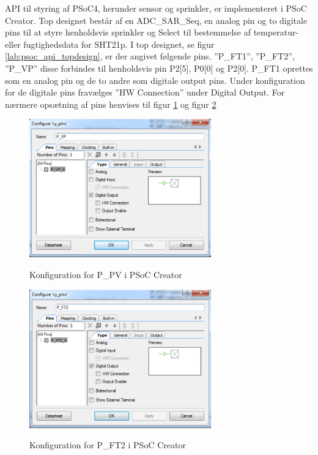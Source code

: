 
API til styring af PSoC4, herunder sensor og sprinkler, er implementeret i PSoC Creator. Top designet består af en ADC\_SAR\_Seq, en analog pin og to digitale pins til at styre henholdsvis sprinkler og Select til bestemmelse af temperatur- eller fugtighedsdata for SHT21p.
I top designet, se figur \ref{lab:psoc_api_topdesign}, er der angivet følgende pins. ''P\_FT1'', ''P\_FT2'', ''P\_VP'' disse forbindes til henholdsvis pin P2[5], P0[0] og P2[0]. P\_FT1 oprettes som en analog pin og de to andre som digitale output pins. Under konfiguration for de digitale pins fravælges ''HW Connection'' under Digital Output. For nærmere opsætning af pins henvises til figur \ref{lab:P_PV_config} og figur \ref{lab:P_FT2_config}

\begin{figure}[htb]
\centering
{\includegraphics[width=0.70\textwidth]{filer/pics/P_PV_config}}
\caption{Konfiguration for P\_PV i PSoC Creator}
\label{lab:P_PV_config}
\end{figure}


\begin{figure}[htb]
\centering
{\includegraphics[width=0.70\textwidth]{filer/pics/P_FT2_config}}
\caption{Konfiguration for P\_FT2 i PSoC Creator}
\label{lab:P_FT2_config}
\end{figure}  

